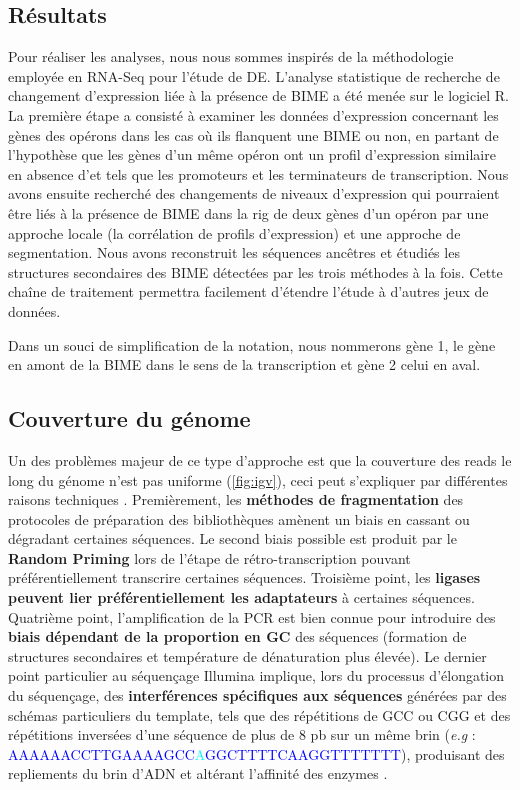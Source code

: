 \documentclass[12pt,a4paper]{report}
\begin{document}
\begin{onehalfspace}
\chapter*{Résultats}

Pour réaliser les analyses, nous nous sommes inspirés de la méthodologie employée en RNA-Seq pour l'étude de DE. L'analyse statistique de recherche de changement d'expression liée à la présence de BIME a été menée sur le logiciel R. La première étape a consisté à examiner les données d'expression concernant les gènes des opérons dans les cas où ils flanquent une BIME ou non, en partant de l'hypothèse que les gènes d'un même opéron ont un profil d'expression similaire en absence d'\gls{et} tels que les promoteurs et les terminateurs de transcription. Nous avons ensuite recherché des changements de niveaux d'expression qui pourraient être liés à la présence de BIME dans la \gls{rig} de deux gènes d'un opéron par une approche locale (la corrélation de profils d'expression) et une approche de segmentation. Nous avons reconstruit les séquences ancêtres et étudiés les structures secondaires des BIME détectées par les trois méthodes à la fois. Cette chaîne de traitement permettra facilement d'étendre l'étude à d'autres jeux de données.

Dans un souci de simplification de la notation, nous nommerons gène 1, le gène en amont de la BIME dans le sens de la transcription et gène 2 celui en aval.

\section*{Couverture du génome}
\label{uniformite_couverture}

Un des problèmes majeur de ce type d'approche est que la couverture des reads le long du génome n'est pas uniforme (\autoref{fig:igv}), ceci peut s'expliquer par différentes raisons techniques \citep{Li2013}. Premièrement, les \textbf{méthodes de fragmentation} des protocoles de préparation des bibliothèques amènent un biais en cassant ou dégradant certaines séquences. Le second biais possible est produit par le \textbf{Random Priming} lors de l'étape de rétro-transcription pouvant préférentiellement transcrire certaines séquences. Troisième point, les \textbf{ligases peuvent lier préférentiellement les adaptateurs} à certaines séquences. Quatrième point, l'amplification de la PCR est bien connue pour introduire des \textbf{biais dépendant de la proportion en GC} des séquences (formation de structures secondaires et température de dénaturation plus élevée). Le dernier point particulier au séquençage Illumina implique, lors du processus d'élongation du séquençage, des \textbf{interférences spécifiques aux séquences} générées par des schémas particuliers du template, tels que des répétitions de GCC ou CGG et des répétitions inversées d'une séquence de plus de 8 pb sur un même brin (\textit{e.g} : \textcolor{blue}{AAAAAACCTTGAAAAGCC}\textcolor{cyan}{A}\textcolor{blue}{GGCTTTTCAAGGTTTTTTT}), produisant des repliements du brin d'ADN et altérant l'affinité des enzymes \citep{Nakamura2011}. 


\end{onehalfspace}
\end{document}
